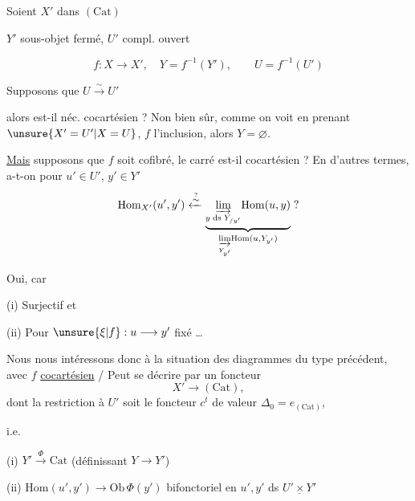 

Soient $X'$ dans $(\mathrm{Cat})$

$Y'$ sous-objet fermé, $U'$ compl. ouvert


\[
f:X\longrightarrow X',\quad Y=f^{-1}(Y'),\qquad U=f^{-1}(U')
\]

Supposons que $U\xrightarrow{\sim}U'$

alors  est-il néc. cocartésien ? Non bien sûr, comme on voit en prenant $\unsure{X'=U'|X=U}$, $f$ l'inclusion, alors $Y=\varnothing$.

\uline{Mais} supposons que $f$ soit cofibré, le carré est-il cocartésien ? En d'autres termes, a-t-on pour $u'\in U'$, $y'\in Y'$
\[
\mathrm{Hom}_{X'}(u',y')\xleftarrow{\overset{?}{\sim}}
\underbrace{\underset{y\;\mathrm{ds}\;Y_{/y'}}{\varinjlim}\mathrm{Hom}(u,y)}_{\underset{Y_{y'}}{\varinjlim}\mathrm{Hom}(u,Y_{y'})}\;?
\]


Oui, car 

(i) Surjectif et

(ii) Pour $\unsure{\xi|f}:u\longrightarrow y'$ fixé \ldots

Nous nous intéressons donc à la situation des diagrammes du type précédent, avec $f$ \uline{cocartésien} / Peut se décrire par un foncteur
\[
X'\longrightarrow(\mathrm{Cat}),
\]
 dont la restriction à $U'$ soit le foncteur $c^t$ de valeur $\Delta_0=e_{(\mathrm{Cat})}$,

i.e.

(i) $Y'\xrightarrow{\Phi}\mathrm{Cat}$ (définissant  $Y\longrightarrow Y'$)

(ii) $\mathrm{Hom}(u',y')\longrightarrow\mathrm{Ob}\,\Phi(y')$ bifonctoriel en $u',y'$ ds $\underline{U'\times Y'}$
